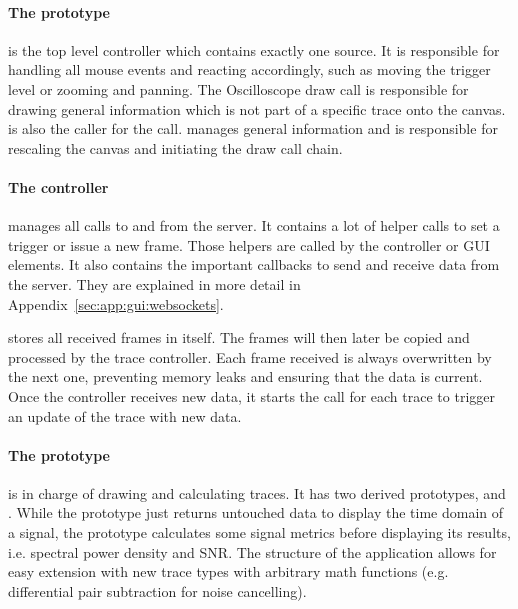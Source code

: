 %
%

\paragraph{The   prototype}  is  the  top level  controller
which contains  exactly one source. It  is responsible for handling  all mouse
events  and  reacting  accordingly,  such  as  moving  the  trigger  level  or
zooming and  panning.  The Oscilloscope  draw call is responsible  for drawing
general information  which is not  part of a  specific trace onto  the canvas.
  is  also  the  caller for  the    
call.   manages general information and  is responsible for
rescaling the canvas and initiating the draw call chain.

\paragraph{The    controller}  manages  all  calls  to  and  from
the  server. It  contains  a  lot  of   helper  calls  to  set  a  trigger  or
issue  a  new  frame. Those  helpers are  called  by  the  
controller or GUI elements.  It also  contains the important callbacks to send
and  receive data  from  the  server. They are  explained  in  more detail  in
Appendix~\ref{sec:app:gui:websockets}.

 stores all received frames in itself. The frames will then later
be  copied and  processed by  the trace  controller.  Each  frame received  is
always overwritten by the next one,  preventing memory leaks and ensuring that
the data is current.  Once the   controller receives new data, it
starts the  call for each trace to trigger an update of the trace
with new data.

\paragraph{The  prototype} is in charge of drawing and calculating
traces. It has  two derived  prototypes,   and .
While the   prototype just  returns untouched data  to display
the  time domain  of a  signal, the   prototype  calculates some
signal metrics before displaying its  results, i.e. spectral power density and
SNR. The structure of the application allows for easy extension with new trace
types with  arbitrary math functions  (e.g. differential pair  subtraction for
noise cancelling).

